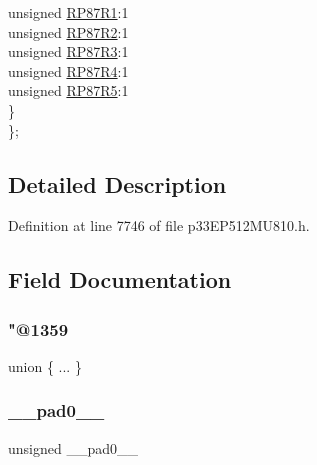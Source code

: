 \begin{DoxyCompactItemize}
\begin{tabbing}
\>\>unsigned \hyperlink{structtag_r_p_o_r6_b_i_t_s_ae4d7353032eeedd8694b7eb1fd62b540}{RP87R1}:1\\
\>\>unsigned \hyperlink{structtag_r_p_o_r6_b_i_t_s_aeb90914c0eaa0e5df6e761163386737d}{RP87R2}:1\\
\>\>unsigned \hyperlink{structtag_r_p_o_r6_b_i_t_s_a596973e9a5804dd2e7c67f39e6418bda}{RP87R3}:1\\
\>\>unsigned \hyperlink{structtag_r_p_o_r6_b_i_t_s_a666f59c08374dae535dac1b61a3e3c2a}{RP87R4}:1\\
\>\>unsigned \hyperlink{structtag_r_p_o_r6_b_i_t_s_a68a469bb8d944635d5648b99d83cf49e}{RP87R5}:1\\
\>\} \\
\}; \\

\end{tabbing}\end{DoxyCompactItemize}


\subsection{Detailed Description}


Definition at line 7746 of file p33\+E\+P512\+M\+U810.\+h.



\subsection{Field Documentation}
\mbox{\label{structtag_r_p_o_r6_b_i_t_s_a5f9e906c2c4f4af827fb21c234798f1e}} 
\subsubsection{\texorpdfstring{"@1359}{@1359}}
{\footnotesize\ttfamily union \{ ... \} }

\mbox{\label{structtag_r_p_o_r6_b_i_t_s_adf71f3d8410c1f1dbbc96680a92c49af}} 
\subsubsection{\texorpdfstring{\+\_\+\+\_\+pad0\+\_\+\+\_\+}{\_\_pad0\_\_}}
{\footnotesize\ttfamily unsigned \+\_\+\+\_\+pad0\+\_\+\+\_\+}



